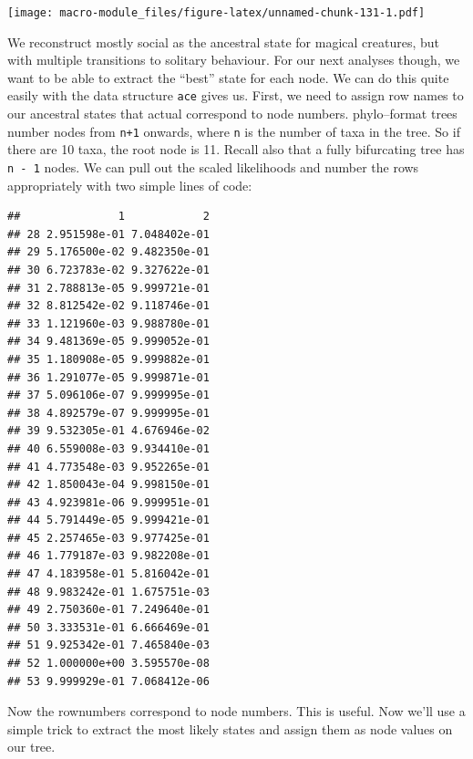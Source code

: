 \documentclass[]{book}
\newenvironment{Shaded}{\begin{snugshade}}{\end{snugshade}}
\newcommand{\KeywordTok}[1]{\textcolor[rgb]{0.13,0.29,0.53}{\textbf{{#1}}}}
\newcommand{\DecValTok}[1]{\textcolor[rgb]{0.00,0.00,0.81}{{#1}}}
\newcommand{\StringTok}[1]{\textcolor[rgb]{0.31,0.60,0.02}{{#1}}}
\newcommand{\NormalTok}[1]{{#1}}
\begin{document}
\texttt{[image: macro-module\_files/figure-latex/unnamed-chunk-131-1.pdf]}

We reconstruct mostly social as the ancestral state for magical
creatures, but with multiple transitions to solitary behaviour. For our
next analyses though, we want to be able to extract the ``best'' state
for each node. We can do this quite easily with the data structure
\texttt{ace} gives us. First, we need to assign row names to our
ancestral states that actual correspond to node numbers. phylo--format
trees number nodes from \texttt{n+1} onwards, where \texttt{n} is the
number of taxa in the tree. So if there are 10 taxa, the root node is
11. Recall also that a fully bifurcating tree has \texttt{n\ -\ 1}
nodes. We can pull out the scaled likelihoods and number the rows
appropriately with two simple lines of code:

\begin{Shaded}
\end{Shaded}

\begin{verbatim}
##               1            2
## 28 2.951598e-01 7.048402e-01
## 29 5.176500e-02 9.482350e-01
## 30 6.723783e-02 9.327622e-01
## 31 2.788813e-05 9.999721e-01
## 32 8.812542e-02 9.118746e-01
## 33 1.121960e-03 9.988780e-01
## 34 9.481369e-05 9.999052e-01
## 35 1.180908e-05 9.999882e-01
## 36 1.291077e-05 9.999871e-01
## 37 5.096106e-07 9.999995e-01
## 38 4.892579e-07 9.999995e-01
## 39 9.532305e-01 4.676946e-02
## 40 6.559008e-03 9.934410e-01
## 41 4.773548e-03 9.952265e-01
## 42 1.850043e-04 9.998150e-01
## 43 4.923981e-06 9.999951e-01
## 44 5.791449e-05 9.999421e-01
## 45 2.257465e-03 9.977425e-01
## 46 1.779187e-03 9.982208e-01
## 47 4.183958e-01 5.816042e-01
## 48 9.983242e-01 1.675751e-03
## 49 2.750360e-01 7.249640e-01
## 50 3.333531e-01 6.666469e-01
## 51 9.925342e-01 7.465840e-03
## 52 1.000000e+00 3.595570e-08
## 53 9.999929e-01 7.068412e-06
\end{verbatim}

Now the rownumbers correspond to node numbers. This is useful. Now we'll
use a simple trick to extract the most likely states and assign them as
node values on our tree.
\end{document}
